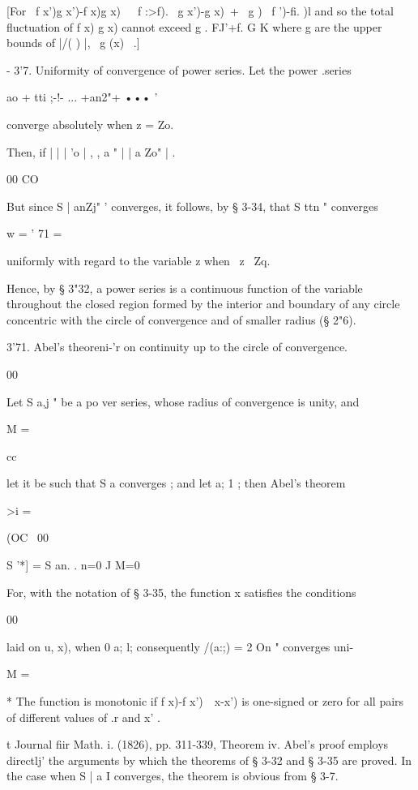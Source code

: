 [For \ f x')g x')-f x)g x)\ \  \ f :>f). \ g x')-g x)\ + \ g  ) \ f  ')-fi. )l 
and so the total fluctuation of f x) g  x) cannot exceed g . FJ'+f. G K where   g are the 
upper bounds of |/( ) |, \ g (x) \ .] 

- 3'7. Uniformity of convergence of power series. 
Let the power .series 

ao + tti ;-!- ... +an2"+ ••• ' 

converge absolutely when z = Zo. 

Then, if |   |   |  'o | , , a " |   | a Zo" | . 

00 CO 

But since S | anZj" ' converges, it follows, by § 3-34, that S ttn " converges 

w = ' 71 = 

uniformly with regard to the variable z when \ z  \ Zq.  

Hence, by § 3"32, a power series is a continuous function of the variable 
throughout the closed region formed by the interior and boundary of any 
circle concentric with the circle of convergence and of smaller radius (§ 2"6). 

  3'71. Abel's theoreni-'r on continuity up to the circle of convergence. 

00 

Let S a,j " be a po ver series, whose radius of convergence is unity, and 

M = 

cc 

let it be such that S a  converges ; and let   a;   1 ; then Abel's theorem 

>i = 

(OC \ 00 

S    '*] = S an. 
. n=0 J M=0 

For, with the notation of § 3-35, the function x  satisfies the conditions 

00 

laid on u,  x), when 0 a; l; consequently /(a:;) = 2 On " converges uni- 

M = 

* The function is monotonic if  f x)-f x')\ \  x-x') is one-signed or zero for all pairs of 
different values of .r and x' . 

t Journal fiir Math. i. (1826), pp. 311-339, Theorem iv. Abel's proof employs directlj' the 
arguments by which the theorems of § 3-32 and § 3-35 are proved. In the case when S | a  I 
converges, the theorem is obvious from § 3-7. 



